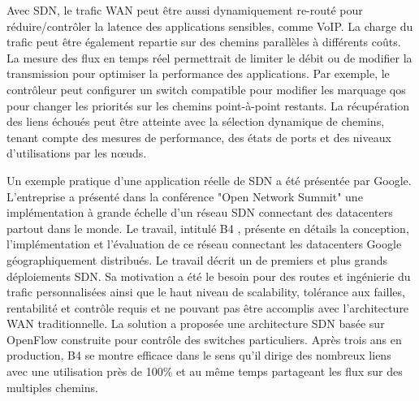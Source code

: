 Avec SDN, le trafic WAN peut être aussi dynamiquement re-routé pour réduire/contrôler la latence des applications sensibles, comme VoIP. La charge du trafic peut être également repartie sur des chemins parallèles à différents coûts.
La mesure des flux en temps réel permettrait de limiter le débit ou de modifier la transmission pour optimiser la performance des applications. Par exemple, le contrôleur peut configurer un switch compatible pour modifier les marquage \gls{qos} pour changer les priorités sur les chemins point-à-point restants.
La récupération des liens échoués peut être atteinte avec la sélection dynamique de chemins, tenant compte des mesures de performance, des états de ports et des niveaux d'utilisations par les nœuds.

Un exemple pratique d'une application réelle de SDN a été présentée par Google. L'entreprise a présenté dans la conférence "Open Network Summit" \cite{googleONS} une implémentation à grande échelle d'un réseau SDN connectant des \glspl{datacenter} partout dans le monde. Le travail, intitulé B4 \cite{SDNWANB4}, présente en détails la conception, l'implémentation et l'évaluation de ce réseau connectant les \glspl{datacenter} Google géographiquement distribués. Le travail décrit un de premiers et plus grands déploiements SDN. Sa motivation a été le besoin pour des routes et ingénierie du trafic personnalisées ainsi que le haut niveau de \gls{scalability}, tolérance aux failles, rentabilité et contrôle requis et ne pouvant pas être accomplis avec l'architecture WAN traditionnelle. La solution a proposée une architecture SDN basée sur OpenFlow construite pour contrôle des switches particuliers. Après trois ans en production, B4 se montre efficace dans le sens qu'il dirige des nombreux liens avec une utilisation près de 100\% et au même temps partageant les flux sur des multiples chemins. \cite{SurveySDNApplications}


